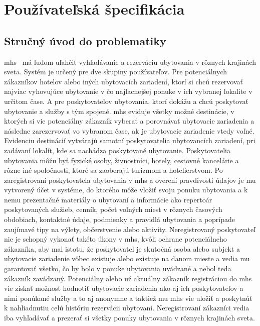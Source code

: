 \setcounter{table}{0}
\section{Používateľská špecifikácia} %
\subsection{Stručný úvod do problematiky}

\acrfull{mhs} \projectName\ má ľuďom uľahčiť vyhľadávanie a rezerváciu 
ubytovania v rôznych krajinách sveta.
Systém je určený pre dve skupiny používateľov. 
Pre potenciálnych zákazníkov hotelov alebo iných ubytovacích zariadení, 
ktorí si chcú rezervovať najviac vyhovujúce ubytovanie v čo najlacnejšej 
ponuke v ich vybranej lokalite v určitom čase. 
A pre poskytovateľov ubytovania, ktorí dokážu a chcú poskytovať ubytovanie 
a služby s tým spojené. 
\acrshort{mhs} eviduje všetky možné destinácie, v ktorých si vie 
potenciálny zákazník vyberať a porovnávať ubytovacie zariadenia a následne 
zarezervovať vo vybranom čase, ak je ubytovacie zariadenie vtedy voľné. 
Evidenciu destinácií vytvárajú samotní poskytovatelia ubytovancích zariadení, 
pri zadávaní lokalít, kde sa nachádza poskytované ubytovanie. 
Poskytovatelia ubytovania môžu byť fyzické osoby, živnostníci, hotely, 
cestovné kancelárie a rôzne iné spoločnosti, ktoré sa zaoberajú turizmom 
a hotelierstvom. 
Po zaregistrovaní poskytovateľa ubytovania v \acrshort{mhs} a overení 
pravdivosti údajov je mu vytvorený účet v systéme, do ktorého môže vložiť 
svoju ponuku ubytovania a k nemu prezentačné materiály o ubytovaní a 
informácie ako repertoár poskytovaných služieb, cenník, počet voľných 
miest v rôznych časových obdobiach, kontaktné údaje, podmienky a 
pravidlá ubytovania a poprípade zaujímavé tipy na výlety, občerstvenie 
alebo aktivity. Neregistrovaný poskytovateľ nie je schopný vykonať takéto 
úkony v \acrshort{mhs}, kvôli ochrane potenciálneho zákazníka, aby mal 
istotu, že poskytovateľ je skutočná osoba alebo subjekt a ubytovacie 
zariadenie vôbec existuje alebo existuje na danom mieste a vedia mu 
garantovať všetko, čo by bolo v ponuke ubytovania uvádzané a nebol teda 
zákazník zavádzaný. Potenciálny alebo už aktuálny zákazník registráciou 
do \acrshort{mhs} vie získať možnosť hodnotiť ubytovacie zariadenia ako 
aj ich poskytovateľov a nimi ponúkané služby a to aj anonymne a taktiež 
mu \acrshort{mhs} vie uložiť a poskytnúť k nahliadnutiu celú históriu 
rezervácii ubytovaní. Neregistrovaní zákazníci vedia iba vyhľadávať a 
prezerať si všetky ponuky ubytovania v rôznych krajinách sveta.
